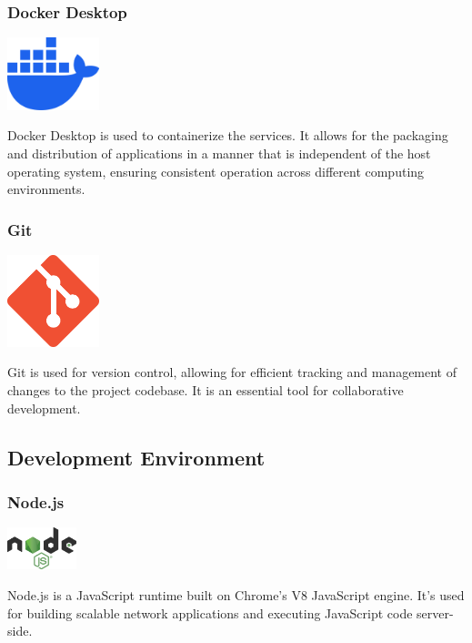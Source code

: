 \subsubsection*{Docker Desktop}
\begin{center}
\includegraphics[width=0.2\textwidth]{Images/logos/docker-mark-blue.png}
\label{fig:docker}
\end{center}
Docker Desktop is used to containerize the services. It allows for the packaging and distribution of applications in a manner that is independent of the host operating system, ensuring consistent operation across different computing environments.

\subsubsection*{Git}
\begin{center}
\includegraphics[width=0.2\textwidth]{Images/logos/Git-Icon-1788C.png}
\label{fig:git}
\end{center}
Git is used for version control, allowing for efficient tracking and management of changes to the project codebase. It is an essential tool for collaborative development.
\subsection{Development Environment}

\subsubsection*{Node.js}

\begin{center}
\includegraphics[width=0.15\textwidth]{Images/logos/node.png}
\label{fig:nodejs}
\end{center}
Node.js is a JavaScript runtime built on Chrome’s V8 JavaScript engine. It’s used for building scalable network applications and executing JavaScript code server-side.

